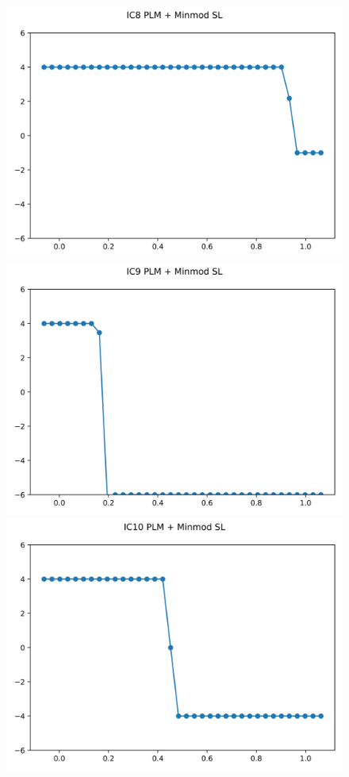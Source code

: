 \documentclass{article}
\begin{document}
\begin{figure}[t]
        \includegraphics[width=.95\textwidth]{../../code/IC8Methodpm_plot.png}
        \includegraphics[width=.95\textwidth]{../../code/IC9Methodpm_plot.png}
        \includegraphics[width=.95\textwidth]{../../code/IC10Methodpm_plot.png}

\end{figure}
\end{document}
